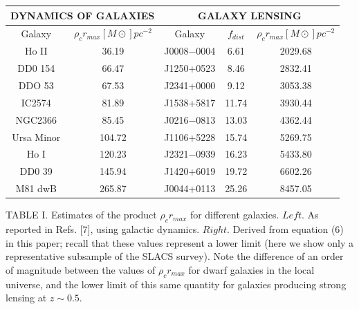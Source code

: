 \documentclass{article}
\begin{document}
\begin{center}
    

\begin{table}[]

\begin{tabular}{|c|c|c|c|c|}
\hline
\multicolumn{2}{|c|}{DYNAMICS OF GALAXIES} & \multicolumn{3}{c|}{GALAXY LENSING} \\ \hline
Galaxy                 & $\rho_cr_{max}[M\odot]pc^{-2}$    & Galaxy  &$f_{dist}$&$\rho_cr_{max}[M\odot]pc^{-2}$           \\ \hline
Ho II                  & 36.19             & J0008−0004    & 6.61    & 2029.68   \\ \hline
DD0 154                & 66.47             & J1250+0523    & 8.46    & 2832.41   \\ \hline
DDO 53                 & 67.53             & J2341+0000    & 9.12    & 3053.38   \\ \hline
IC2574                 & 81.89             & J1538+5817    & 11.74   & 3930.44   \\ \hline
NGC2366                & 85.45             & J0216−0813    & 13.03   & 4362.44   \\ \hline
Ursa Minor             & 104.72            & J1106+5228    & 15.74   & 5269.75   \\ \hline
Ho I                   & 120.23            & J2321−0939    & 16.23   & 5433.80   \\ \hline
DD0 39                 & 145.94            & J1420+6019    & 19.72   & 6602.26   \\ \hline
M81 dwB                & 265.87            & J0044+0113    & 25.26   & 8457.05   \\ \hline
\end{tabular}
\end{table}
\end{center}
TABLE I. Estimates of the product $\rho_cr_{max}$ for different galaxies. $Left$. As reported in Refs. [7], using galactic dynamics.
$Right$. Derived from equation (6) in this paper; recall that these values represent a lower limit (here we show only a representative
subsample of the SLACS survey). Note the difference of an order of magnitude between the values of $\rho_cr_{max}$ for dwarf galaxies
in the local universe, and the lower limit of this same quantity for galaxies producing strong lensing at $z \sim 0.5$.
\end{document}
